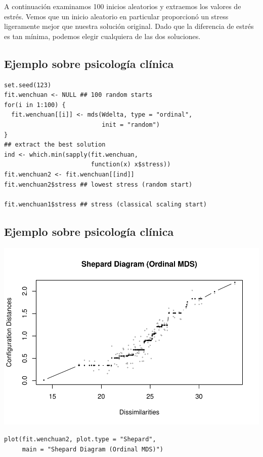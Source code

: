 \documentclass[]{article}
\begin{document}
\hypertarget{right}{}
A continuación examinamos 100 inicios aleatorios y extraemos los valores
de estrés. Vemos que un inicio aleatorio en particular proporcionó un
stress ligeramente mejor que nuestra solución original. Dado que la
diferencia de estrés es tan mínima, podemos elegir cualquiera de las dos
soluciones.

\subsection{Ejemplo sobre psicología
clínica}\label{ejemplo-sobre-psicologuxeda-cluxednica-11}

\begin{verbatim}
set.seed(123)
fit.wenchuan <- NULL ## 100 random starts
for(i in 1:100) {
  fit.wenchuan[[i]] <- mds(Wdelta, type = "ordinal",
                           init = "random")
}
## extract the best solution
ind <- which.min(sapply(fit.wenchuan,
                        function(x) x$stress))
fit.wenchuan2 <- fit.wenchuan[[ind]]
fit.wenchuan2$stress ## lowest stress (random start)

fit.wenchuan1$stress ## stress (classical scaling start)
\end{verbatim}

\subsection{Ejemplo sobre psicología
clínica}\label{ejemplo-sobre-psicologuxeda-cluxednica-12}

\hypertarget{left}{}
\includegraphics{Clase-4_files/figure-latex/unnamed-chunk-35-1.pdf}

\hypertarget{right}{}
\begin{verbatim}
plot(fit.wenchuan2, plot.type = "Shepard",
     main = "Shepard Diagram (Ordinal MDS)")
\end{verbatim}
\end{document}
